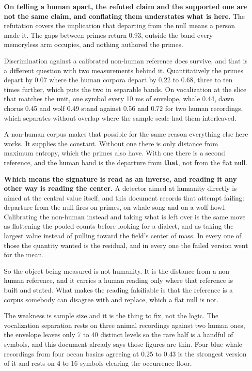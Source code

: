 \textbf{On telling a human apart, the refuted claim and the supported one are not the same claim, and conflating them understates what is here.} The refutation covers the implication that departing from the null means a person made it. The gaps between primes return 0.93, outside the band every memoryless arm occupies, and nothing authored the primes.

Discrimination against a calibrated non-human reference does survive, and that is a different question with two measurements behind it. Quantitatively the primes depart by 0.07 where the human corpora depart by 0.22 to 0.68, three to ten times further, which puts the two in separable bands. On vocalization at the slice that matches the unit, one symbol every 10 ms of envelope, whale 0.44, dawn chorus 0.45 and wolf 0.49 stand against 0.56 and 0.72 for two human recordings, which separates without overlap where the sample scale had them interleaved.

A non-human corpus makes that possible for the same reason everything else here works. It supplies the constant. Without one there is only distance from maximum entropy, which the primes also have. With one there is a second reference, and the human band is the departure from \textbf{that}, not from the flat null.

\textbf{Which means the signature is read as an inverse, and reading it any other way is reading the center.} A detector aimed at humanity directly is aimed at the central value itself, and this document records that attempt failing: departure from the null fires on primes, on whale song and on a wolf howl. Calibrating the non-human instead and taking what is left over is the same move as flattening the pooled counts before looking for a dialect, and as taking the largest value instead of pulling toward the field's center of mass. In every one of those the quantity wanted is the residual, and in every one the failed version went for the mean.

So the object being measured is not humanity. It is the distance from a non-human reference, and it carries a human reading only where that reference is built and stated. What makes the reading falsifiable is that the reference is a corpus somebody can disagree with and replace, which a flat null is not.

The weakness is sample size and it is the thing to fix, not the logic. The vocalization separation rests on three animal recordings against two human ones, the envelope leaves only 7 to 40 distinct levels so the rare half is a handful of symbols, and this document already says those figures are thin. Four blue whale recordings from four ocean basins agreeing at 0.25 to 0.43 is the strongest version of it and rests on 4 to 16 symbols clearing the occurrence floor.


